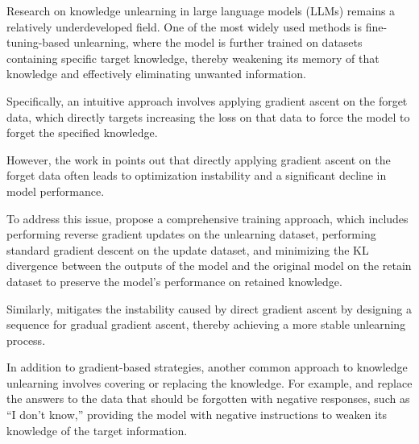 \documentclass[11pt]{article}
\begin{document}
Research on knowledge unlearning in large language models (LLMs) remains a relatively underdeveloped field. One of the most widely used methods is fine-tuning-based unlearning, where the model is further trained on datasets containing specific target knowledge, thereby weakening its memory of that knowledge and effectively eliminating unwanted information.

Specifically, an intuitive approach involves applying gradient ascent on the forget data, which directly targets increasing the loss on that data to force the model to forget the specified knowledge. 

However, the work in \citet{wang2024llm} points out that directly applying gradient ascent on the forget data often leads to optimization instability and a significant decline in model performance.

 To address this issue, \citet{veldanda2024llm} propose a comprehensive training approach, which includes performing reverse gradient updates on the unlearning dataset, performing standard gradient descent on the update dataset, and minimizing the KL divergence between the outputs of the model and the original model on the retain dataset to preserve the model's performance on retained knowledge. 

 Similarly, \citet{jang2022knowledge} mitigates the instability caused by direct gradient ascent by designing a sequence for gradual gradient ascent, thereby achieving a more stable unlearning process.

In addition to gradient-based strategies, another common approach to knowledge unlearning involves covering or replacing the knowledge. For example, \citet{choi2024snap} and \citet{shi2024ulmr} replace the answers to the data that should be forgotten with negative responses, such as “I don’t know,” providing the model with negative instructions to weaken its knowledge of the target information.
\end{document}
